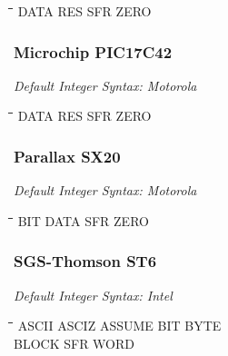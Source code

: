 {\tt\begin{tabbing}
\hspace{3cm}\=\hspace{3cm}\=\hspace{3cm}\=\hspace{3cm}\=\kill
DATA       \> RES         \> SFR         \> ZERO \\
\end{tabbing}}

\subsubsection{Microchip PIC17C42}

{\em Default Integer Syntax: Motorola}

{\tt\begin{tabbing}
\hspace{3cm}\=\hspace{3cm}\=\hspace{3cm}\=\hspace{3cm}\=\kill
DATA       \> RES         \> SFR         \> ZERO \\
\end{tabbing}}

\subsubsection{Parallax SX20}

{\em Default Integer Syntax: Motorola}

{\tt\begin{tabbing}
\hspace{3cm}\=\hspace{3cm}\=\hspace{3cm}\=\hspace{3cm}\=\kill
BIT        \> DATA        \> SFR         \> ZERO \\
\end{tabbing}}

\subsubsection{SGS-Thomson ST6}

{\em Default Integer Syntax: Intel}

{\tt\begin{tabbing}
\hspace{3cm}\=\hspace{3cm}\=\hspace{3cm}\=\hspace{3cm}\=\kill
ASCII      \> ASCIZ       \> ASSUME      \> BIT  \>  BYTE \\
BLOCK      \> SFR         \> WORD \\
\end{tabbing}}

